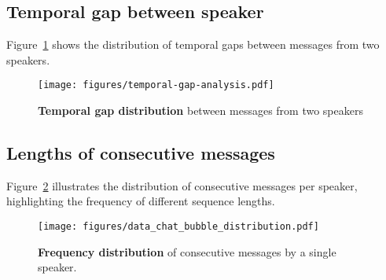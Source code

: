 \begin{table}[h!] %
\centering
{}
\captionsetup{justification=centering} %
\caption{\textbf{QA \& Event Statistics}}
\vspace{-0.3cm}
\label{tab:qa-statistics}
\end{table}




\subsection{Temporal gap between speaker}
\label{appendix:temporal-gap}
Figure~\ref{fig:temporal_gap_distribution} shows the distribution of temporal gaps between messages from two speakers.

\begin{figure}[h]
    \centering
    \texttt{[image: figures/temporal-gap-analysis.pdf]}
\caption{\textbf{Temporal gap distribution} between messages from two speakers}
\vspace{-0.3cm}
\label{fig:temporal_gap_distribution}

\end{figure}
\subsection{Lengths of consecutive messages}
\label{appendix:chat-bubbles}
Figure~\ref{fig:chat_bubble_distribution} illustrates the distribution of consecutive messages per speaker, highlighting the frequency of different sequence lengths.
\begin{figure}[h]
    \centering
    \texttt{[image: figures/data\_chat\_bubble\_distribution.pdf]}
    \caption{\textbf{Frequency distribution} of consecutive messages by a single speaker.}    \label{fig:chat_bubble_distribution}
\end{figure}
